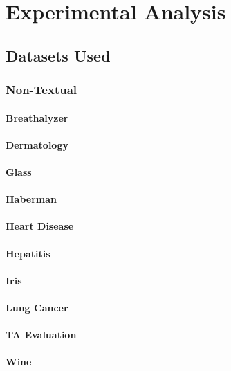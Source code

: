 \documentclass[a4paper,11pt]{report}
\begin{document}
\chapter{Experimental Analysis\label{cha:expanalysis}}
\section{Datasets Used}
\subsection{Non-Textual}
\subsubsection*{Breathalyzer}\label{sec:breathalyzer}
\subsubsection*{Dermatology}\label{sec:dermatology}
\subsubsection*{Glass}\label{sec:glass}
\subsubsection*{Haberman}\label{sec:haberman}
\subsubsection*{Heart Disease}\label{sec:heart_disease}
\subsubsection*{Hepatitis}\label{sec:hepatitis}
\subsubsection*{Iris}\label{sec:iris}
\subsubsection*{Lung Cancer}\label{sec:lung_cancer}
\subsubsection*{TA Evaluation}\label{sec:taevaluation}
\subsubsection*{Wine}\label{sec:wine}
\end{document}
